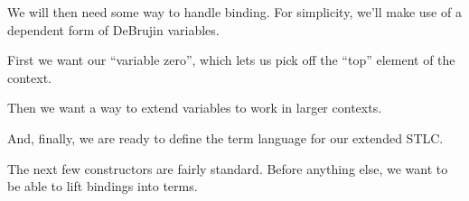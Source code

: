 We will then need some way to handle binding.
For simplicity, we'll make use of a dependent form of DeBrujin variables.

\begin{code}%
\>  \AgdaSymbol{(} \AgdaSymbol{:} \AgdaSymbol{)} \AgdaSymbol{:}    \<%
\end{code}

First we want our ``variable zero'', which lets us pick off the ``top'' element of the context.

\begin{code}%
\>[0]\<[2]%
\>[2] \AgdaSymbol{:}  \AgdaSymbol{\{}\AgdaSymbol{\}}    \AgdaSymbol{(} \AgdaInductiveConstructor{::} \AgdaSymbol{)}\<%
\end{code}

Then we want a way to extend variables to work in larger contexts.

\begin{code}%
\>[0]\<[2]%
\>[2] \AgdaSymbol{:}  \AgdaSymbol{\{} \AgdaSymbol{\}}        \AgdaSymbol{(} \AgdaInductiveConstructor{::} \AgdaSymbol{)}\<%
\end{code}

And, finally, we are ready to define the term language for our extended STLC.

\begin{code}%
\>  \AgdaSymbol{(} \AgdaSymbol{:} \AgdaSymbol{)} \AgdaSymbol{:}    \<%
\end{code}

The next few constructors are fairly standard.
Before anything else, we want to be able to lift bindings into terms.

\begin{code}%
\>[0]\<[2]%
\>[2] \AgdaSymbol{:}  \AgdaSymbol{\{}\AgdaSymbol{\}}        \<%
\end{code}

